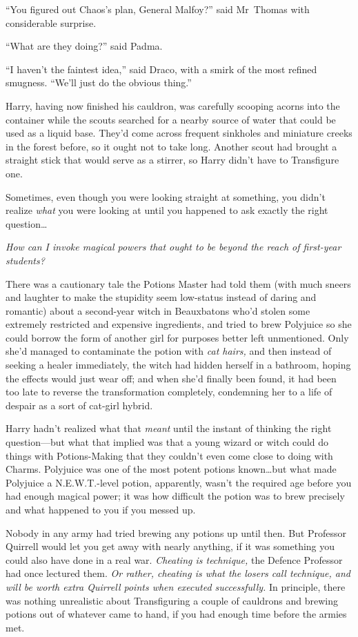 “You figured out Chaos’s plan, General Malfoy?” said Mr~Thomas with considerable surprise.

“What are they doing?” said Padma.

“I haven’t the faintest idea,” said Draco, with a smirk of the most refined smugness. “We’ll just do the obvious thing.”

\later

Harry, having now finished his cauldron, was carefully scooping acorns into the container while the scouts searched for a nearby source of water that could be used as a liquid base. They’d come across frequent sinkholes and miniature creeks in the forest before, so it ought not to take long. Another scout had brought a straight stick that would serve as a stirrer, so Harry didn’t have to Transfigure one.

Sometimes, even though you were looking straight at something, you didn’t realize \emph{what} you were looking at until you happened to ask exactly the right question…

\emph{How can I invoke magical powers that ought to be beyond the reach of first-year students?}

There was a cautionary tale the Potions Master had told them (with much sneers and laughter to make the stupidity seem low-status instead of daring and romantic) about a second-year witch in Beauxbatons who’d stolen some extremely restricted and expensive ingredients, and tried to brew Polyjuice so she could borrow the form of another girl for purposes better left unmentioned. Only she’d managed to contaminate the potion with \emph{cat hairs,} and then instead of seeking a healer immediately, the witch had hidden herself in a bathroom, hoping the effects would just wear off; and when she’d finally been found, it had been too late to reverse the transformation completely, condemning her to a life of despair as a sort of cat-girl hybrid.

Harry hadn’t realized what that \emph{meant} until the instant of thinking the right question—but what that implied was that a young wizard or witch could do things with Potions-Making that they couldn’t even come close to doing with Charms. Polyjuice was one of the most potent potions known…but what made Polyjuice a N.E.W.T.-level potion, apparently, wasn’t the required age before you had enough magical power; it was how difficult the potion was to brew precisely and what happened to you if you messed up.

Nobody in any army had tried brewing any potions up until then. But Professor Quirrell would let you get away with nearly anything, if it was something you could also have done in a real war. \emph{Cheating is technique,} the Defence Professor had once lectured them. \emph{Or rather, cheating is what the losers call technique, and will be worth extra Quirrell points when executed successfully.} In principle, there was nothing unrealistic about Transfiguring a couple of cauldrons and brewing potions out of whatever came to hand, if you had enough time before the armies met.

